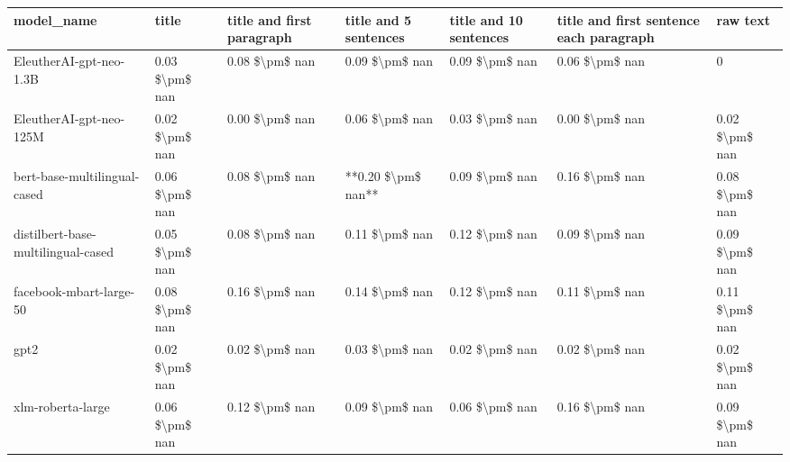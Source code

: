 \begin{tabular}{lllllll}
\toprule
                        model\_name &          title & title and first paragraph & title and 5 sentences & title and 10 sentences & title and first sentence each paragraph &       raw text \\
\midrule
           EleutherAI-gpt-neo-1.3B & 0.03 \$\textbackslash pm\$ nan &            0.08 \$\textbackslash pm\$ nan &        0.09 \$\textbackslash pm\$ nan &         0.09 \$\textbackslash pm\$ nan &                          0.06 \$\textbackslash pm\$ nan &              0 \\
           EleutherAI-gpt-neo-125M & 0.02 \$\textbackslash pm\$ nan &            0.00 \$\textbackslash pm\$ nan &        0.06 \$\textbackslash pm\$ nan &         0.03 \$\textbackslash pm\$ nan &                          0.00 \$\textbackslash pm\$ nan & 0.02 \$\textbackslash pm\$ nan \\
      bert-base-multilingual-cased & 0.06 \$\textbackslash pm\$ nan &            0.08 \$\textbackslash pm\$ nan &    **0.20 \$\textbackslash pm\$ nan** &         0.09 \$\textbackslash pm\$ nan &                          0.16 \$\textbackslash pm\$ nan & 0.08 \$\textbackslash pm\$ nan \\
distilbert-base-multilingual-cased & 0.05 \$\textbackslash pm\$ nan &            0.08 \$\textbackslash pm\$ nan &        0.11 \$\textbackslash pm\$ nan &         0.12 \$\textbackslash pm\$ nan &                          0.09 \$\textbackslash pm\$ nan & 0.09 \$\textbackslash pm\$ nan \\
           facebook-mbart-large-50 & 0.08 \$\textbackslash pm\$ nan &            0.16 \$\textbackslash pm\$ nan &        0.14 \$\textbackslash pm\$ nan &         0.12 \$\textbackslash pm\$ nan &                          0.11 \$\textbackslash pm\$ nan & 0.11 \$\textbackslash pm\$ nan \\
                              gpt2 & 0.02 \$\textbackslash pm\$ nan &            0.02 \$\textbackslash pm\$ nan &        0.03 \$\textbackslash pm\$ nan &         0.02 \$\textbackslash pm\$ nan &                          0.02 \$\textbackslash pm\$ nan & 0.02 \$\textbackslash pm\$ nan \\
                 xlm-roberta-large & 0.06 \$\textbackslash pm\$ nan &            0.12 \$\textbackslash pm\$ nan &        0.09 \$\textbackslash pm\$ nan &         0.06 \$\textbackslash pm\$ nan &                          0.16 \$\textbackslash pm\$ nan & 0.09 \$\textbackslash pm\$ nan \\
\bottomrule
\end{tabular}
